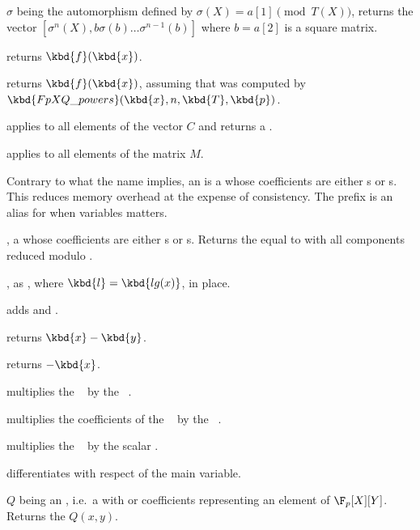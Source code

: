 $\sigma$ being the automorphism defined by $\sigma(X)=a[1]\pmod{T(X)}$,
returns the vector $[\sigma^n(X),b\sigma(b)\ldots\sigma^{n-1}(b)]$
where $b=a[2]$ is a square matrix.

 returns
$\kbd{f}(\kbd{x})$.

 returns
$\kbd{f}(\kbd{x})$, assuming that  was computed by
$\kbd{FpXQ\_powers}(\kbd{x}, n, \kbd{T}, \kbd{p})$.

 applies
 to all elements of the vector $C$
and returns a .

 applies
 to all elements of the matrix $M$.

Contrary to what the name implies, an  is a  whose
coefficients are either s or s. This reduces memory
overhead at the expense of consistency. The prefix  is an
alias for  when variables matters.

,  a  whose coefficients are
either s or s. Returns the  equal to  with
all components reduced modulo .

, as , where
$\kbd{l} = \kbd{lg(x)}$, in place.

 adds  and .

 returns $\kbd{x}-\kbd{y}$.

 returns $-\kbd{x}$.

 multiplies the ~
by the ~.

 multiplies the coefficients of the
~ by the ~.

 multiplies the ~
by the scalar .

 differentiates  with respect of
the main variable.

 $Q$ being an ,
i.e.~a  with  or  coefficients representing an
element of $\F_p[X][Y]$. Returns the  $Q(x,y)$.

